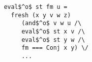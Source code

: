 
\begin{figure}[!t]
  \centering
  \begin{minipage}{0.49\textwidth}
    \begin{lstlisting}
            eval$^o$ st fm u = 
              fresh (x y v w z) 
                 (and$^o$ v w u /\
                 eval$^o$ st x v /\
                 eval$^o$ st y w /\
                 fm === Conj x y) \/
                 ... 
    \end{lstlisting}
  \end{minipage}
\end{figure}